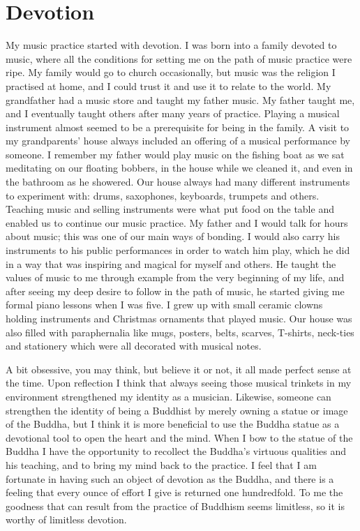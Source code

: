 \section{Devotion}

My music practice started with devotion. I was born into a family
devoted to music, where all the conditions for setting me on the path of
music practice were ripe. My family would go to church occasionally, but
music was the religion I practised at home, and I could trust it and use
it to relate to the world. My grandfather had a music store and taught
my father music. My father taught me, and I eventually taught others
after many years of practice. Playing a musical instrument almost seemed
to be a prerequisite for being in the family. A visit to my
grandparents' house always included an offering of a musical performance
by someone. I remember my father would play music on the fishing boat as
we sat meditating on our floating bobbers, in the house while we cleaned
it, and even in the bathroom as he showered. Our house always had many
different instruments to experiment with: drums, saxophones, keyboards, 
trumpets and others. Teaching music and selling instruments were what
put food on the table and enabled us to continue our music practice. My
father and I would talk for hours about music; this was one of our main
ways of bonding. I would also carry his instruments to his public
performances in order to watch him play, which he did in a way that was
inspiring and magical for myself and others. He taught the values of
music to me through example from the very beginning of my life, and
after seeing my deep desire to follow in the path of music, he started
giving me formal piano lessons when I was five. I grew up with small
ceramic clowns holding instruments and Christmas ornaments that played
music. Our house was also filled with paraphernalia like mugs, posters, 
belts, scarves, T-shirts, neck-ties and stationery which were all
decorated with musical notes. 

A bit obsessive, you may think, but believe it or not, it all made
perfect sense at the time. Upon reflection I think that always seeing
those musical trinkets in my environment strengthened my identity as a
musician. Likewise, someone can strengthen the identity of being a
Buddhist by merely owning a statue or image of the Buddha, but I think
it is more beneficial to use the Buddha statue as a devotional tool to
open the heart and the mind. When I bow to the statue of the Buddha I
have the opportunity to recollect the Buddha's virtuous qualities and
his teaching, and to bring my mind back to the practice. I feel that I
am fortunate in having such an object of devotion as the Buddha, and
there is a feeling that every ounce of effort I give is returned one
hundredfold. To me the goodness that can result from the practice of
Buddhism seems limitless, so it is worthy of limitless devotion. 

